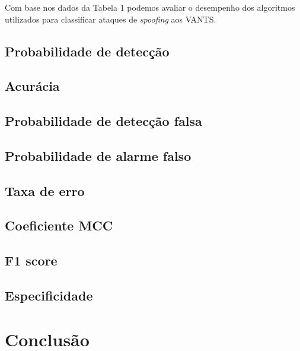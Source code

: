 \documentclass[12pt]{article}
\begin{document}

Com base nos dados da Tabela 1 podemos avaliar o desempenho dos algoritmos utilizados 
para classificar ataques de \textit{spoofing} aos VANTS.
\subsection{Probabilidade de detecção}
\subsection{Acurácia}
\subsection{Probabilidade de detecção falsa}
\subsection{Probabilidade de alarme falso}
\subsection{Taxa de erro}
\subsection{Coeficiente MCC}
\subsection{F1 score}
\subsection{Especificidade}

\section{Conclusão}
\printbibliography
\end{document}
